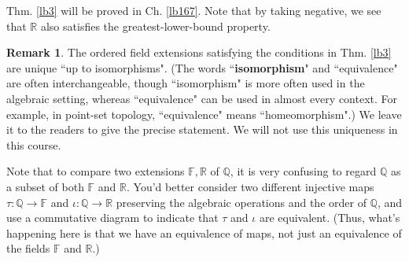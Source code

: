 \documentclass[12pt,b5paper,notitlepage]{article}
\theoremstyle{definition}
\newtheorem{rem}[df]{Remark}
\theoremstyle{plain}
\newcommand{\Qbb}{\mathbb Q}
\newcommand{\Rbb}{\mathbb R}
\newcommand{\Fbb}{\mathbb F}
\numberwithin{equation}{section}
\begin{document}
Thm. \ref{lb3} will be proved in Ch. \ref{lb167}. Note that by taking negative, we see that $\Rbb$ also satisfies the greatest-lower-bound property.


\begin{rem}
The ordered field extensions satisfying the conditions in Thm. \ref{lb3} are unique ``up to isomorphisms". (The words ``\textbf{isomorphism}"  and ``equivalence" are often interchangeable, though ``isomorphism" is more often used in the algebraic setting, whereas ``equivalence" can be used in almost every context. For example, in point-set topology, ``equivalence" means ``homeomorphism".) We leave it to the readers to give the precise statement. We will not use this uniqueness in this course. 

Note that to compare two extensions $\Fbb,\Rbb$ of $\Qbb$, it is very confusing to regard $\Qbb$ as a subset of both $\Fbb$ and $\Rbb$. You'd better consider two different injective maps $\tau:\Qbb\rightarrow \Fbb$ and $\iota:\Qbb\rightarrow\Rbb$ preserving the algebraic operations and the order of $\Qbb$, and use a commutative diagram to indicate that $\tau$ and $\iota$ are equivalent. (Thus, what's happening here is that we have an equivalence of maps, not just an equivalence of the fields $\Fbb$ and $\Rbb$.) \hfill\qedsymbol
\end{rem}
\end{document}
